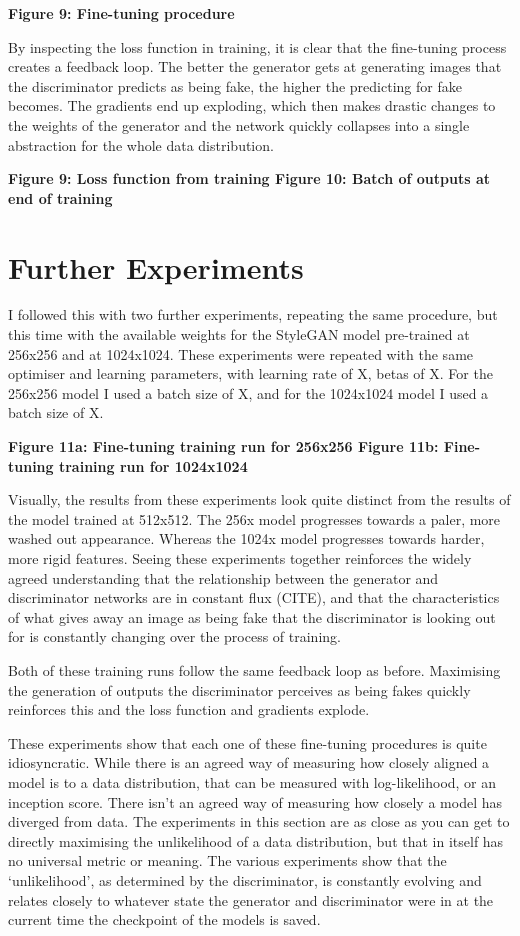 \textbf{Figure 9: Fine-tuning procedure}

By inspecting the loss function in training, it is clear that the fine-tuning process creates a feedback loop. 
The better the generator gets at generating images that the discriminator predicts as being fake, the higher the predicting for fake becomes. 
The gradients end up exploding, which then makes drastic changes to the weights of the generator and the network quickly collapses into a single abstraction for the whole data distribution. 

\textbf{Figure 9: Loss function from training
Figure 10: Batch of outputs at end of training}

\section{Further Experiments}

I followed this with two further experiments, repeating the same procedure, but this time with the available weights for the StyleGAN model pre-trained at 256x256 and at 1024x1024. 
These experiments were repeated with the same optimiser and learning parameters, with learning rate of X, betas of X. 
For the 256x256 model I used a batch size of X, and for the 1024x1024 model I used a batch size of X. 

\textbf{Figure 11a: Fine-tuning training run for 256x256
Figure 11b: Fine-tuning training run for 1024x1024}

Visually, the results from these experiments look quite distinct from the results of the model trained at 512x512. 
The 256x model progresses towards a paler, more washed out appearance. Whereas the 1024x model progresses towards harder, more rigid features. 
Seeing these experiments together reinforces the widely agreed understanding that the relationship between the generator and discriminator networks are in constant flux (CITE), and that the characteristics of what gives away an image as being fake that the discriminator is looking out for is constantly changing over the process of training.  

Both of these training runs follow the same feedback loop as before. 
Maximising the generation of outputs the discriminator perceives as being fakes quickly reinforces this and the loss function and gradients explode.

These experiments show that each one of these fine-tuning procedures is quite idiosyncratic. 
While there is an agreed way of measuring how closely aligned a model is to a data distribution, that can be measured with log-likelihood, or an inception score. 
There isn’t an agreed way of measuring how closely a model has diverged from data. 
The experiments in this section are as close as you can get to directly maximising the unlikelihood of a data distribution, but that in itself has no universal metric or meaning. 
The various experiments show that the ‘unlikelihood’, as determined by the discriminator, is constantly evolving and relates closely to whatever state the generator and discriminator were in at the current time the checkpoint of the models is saved. 

